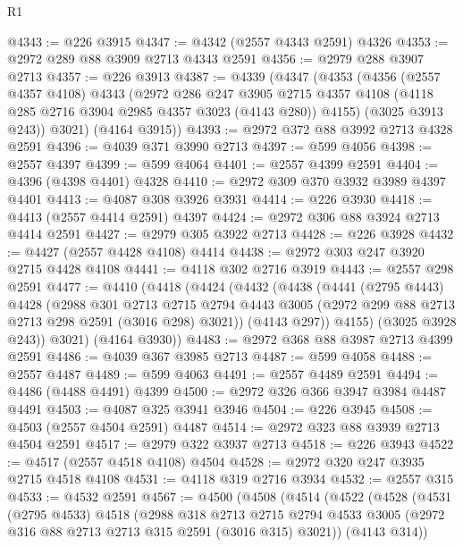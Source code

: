 \begin{lexlean}{R1}
\begin{coremodule}
@4343 := @226 @3915
@4347 := @4342 (@2557 @4343 @2591) @4326
@4353 := @2972 @289 @88 @3909 @2713 @4343 @2591
@4356 := @2979 @288 @3907 @2713
@4357 := @226 @3913
@4387 := @4339
    (@4347
      (@4353
        (@4356
          (@2557 @4357 @4108)
          @4343
          (@2972
            @286
            @247
            @3905
            @2715
            @4357
            @4108
            (@4118 @285 @2716 @3904 @2985 @4357 @3023 (@4143 @280))
            @4155)
          (@3025 @3913 @243))
        @3021)
      (@4164 @3915))
@4393 := @2972 @372 @88 @3992 @2713 @4328 @2591
@4396 := @4039 @371 @3990 @2713
@4397 := @599 @4056
@4398 := @2557 @4397
@4399 := @599 @4064
@4401 := @2557 @4399 @2591
@4404 := @4396 (@4398 @4401) @4328
@4410 := @2972 @309 @370 @3932 @3989 @4397 @4401
@4413 := @4087 @308 @3926 @3931
@4414 := @226 @3930
@4418 := @4413 (@2557 @4414 @2591) @4397
@4424 := @2972 @306 @88 @3924 @2713 @4414 @2591
@4427 := @2979 @305 @3922 @2713
@4428 := @226 @3928
@4432 := @4427 (@2557 @4428 @4108) @4414
@4438 := @2972 @303 @247 @3920 @2715 @4428 @4108
@4441 := @4118 @302 @2716 @3919
@4443 := @2557 @298 @2591
@4477 := @4410
    (@4418
      (@4424
        (@4432
          (@4438
            (@4441
              (@2795 @4443)
              @4428
              (@2988
                @301
                @2713
                @2715
                @2794
                @4443
                @3005
                (@2972 @299 @88 @2713 @2713 @298 @2591 (@3016 @298) @3021))
              (@4143 @297))
            @4155)
          (@3025 @3928 @243))
        @3021)
      (@4164 @3930))
@4483 := @2972 @368 @88 @3987 @2713 @4399 @2591
@4486 := @4039 @367 @3985 @2713
@4487 := @599 @4058
@4488 := @2557 @4487
@4489 := @599 @4063
@4491 := @2557 @4489 @2591
@4494 := @4486 (@4488 @4491) @4399
@4500 := @2972 @326 @366 @3947 @3984 @4487 @4491
@4503 := @4087 @325 @3941 @3946
@4504 := @226 @3945
@4508 := @4503 (@2557 @4504 @2591) @4487
@4514 := @2972 @323 @88 @3939 @2713 @4504 @2591
@4517 := @2979 @322 @3937 @2713
@4518 := @226 @3943
@4522 := @4517 (@2557 @4518 @4108) @4504
@4528 := @2972 @320 @247 @3935 @2715 @4518 @4108
@4531 := @4118 @319 @2716 @3934
@4532 := @2557 @315
@4533 := @4532 @2591
@4567 := @4500
    (@4508
      (@4514
        (@4522
          (@4528
            (@4531
              (@2795 @4533)
              @4518
              (@2988
                @318
                @2713
                @2715
                @2794
                @4533
                @3005
                (@2972 @316 @88 @2713 @2713 @315 @2591 (@3016 @315) @3021))
              (@4143 @314))

\end{coremodule}
\end{lexlean}
